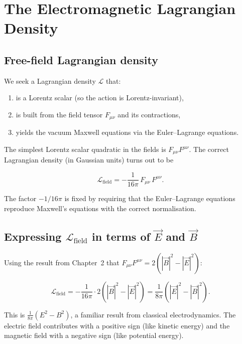\section{The Electromagnetic Lagrangian Density}

\subsection*{Free-field Lagrangian density}

We seek a Lagrangian density $\mathcal{L}$ that:
\begin{enumerate}
\item is a Lorentz scalar (so the action is Lorentz-invariant),
\item is built from the field tensor $F_{\mu\nu}$ and its contractions,
\item yields the vacuum Maxwell equations via the Euler--Lagrange equations.
\end{enumerate}

The simplest Lorentz scalar quadratic in the fields is $F_{\mu\nu}F^{\mu\nu}$. The correct Lagrangian density (in Gaussian units) turns out to be

\begin{equation}
\boxed{\mathcal{L}_{\text{field}} = -\frac{1}{16\pi}\,F_{\mu\nu}\,F^{\mu\nu}.}
\end{equation}

The factor $-1/16\pi$ is fixed by requiring that the Euler--Lagrange equations reproduce Maxwell's equations with the correct normalisation.

\subsection*{Expressing $\mathcal{L}_{\text{field}}$ in terms of $\vec{E}$ and $\vec{B}$}

Using the result from Chapter~2 that $F_{\mu\nu}F^{\mu\nu} = 2(|\vec{B}|^2 - |\vec{E}|^2)$:

\begin{equation}
\mathcal{L}_{\text{field}} = -\frac{1}{16\pi}\cdot 2(|\vec{B}|^2 - |\vec{E}|^2) = \frac{1}{8\pi}(|\vec{E}|^2 - |\vec{B}|^2).
\end{equation}

This is $\frac{1}{8\pi}(E^2 - B^2)$, a familiar result from classical electrodynamics. The electric field contributes with a positive sign (like kinetic energy) and the magnetic field with a negative sign (like potential energy).

